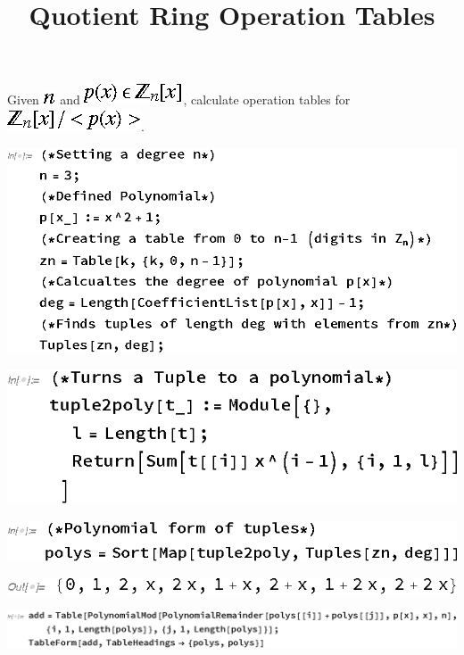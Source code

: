 \documentclass{article}
\begin{document}
\title{Quotient Ring Operation Tables}
\author{}
\date{}
\maketitle

Given \includegraphics{gr1.eps} and \includegraphics{gr2.eps}, calculate operation tables for \includegraphics{gr3.eps}. 

\includegraphics{gr4.eps}

\includegraphics{gr5.eps}

\includegraphics{gr6.eps}

\includegraphics{gr7.eps}

\includegraphics{gr8.eps}
\end{document}
